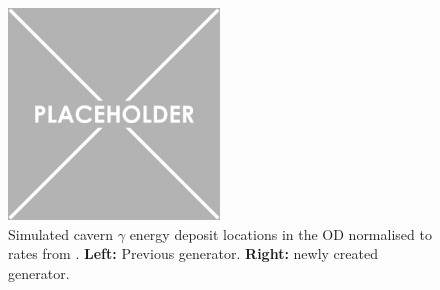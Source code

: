 \begin{figure}[!htbp]
    \centering
    \includegraphics[width=0.5\textwidth]{Figures/Placeholder.png}
    \caption{Simulated cavern $\gamma$ energy deposit locations in the OD normalised to rates from \cite{LZ_Gamma_Ray_Background_ref}. \textbf{Left:} Previous generator. \textbf{Right:} newly created generator.}
    \label{fig:cavern_gamma_position_distribution}
\end{figure}

